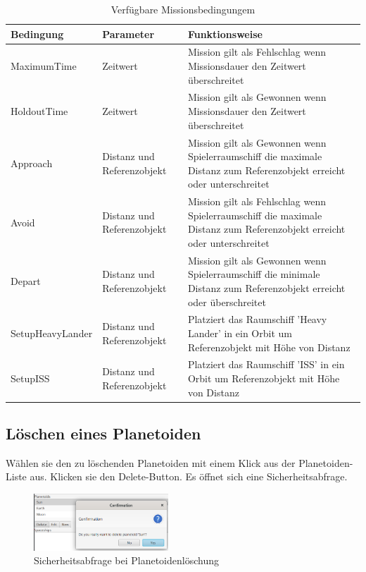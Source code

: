 \begin{table}[H]
	\centering
	\begin{tabular}{ || m{3cm} | m{5cm} | m{8cm} || }
		\hline
		\textbf{Bedingung} & \textbf{Parameter} & \textbf{Funktionsweise} \\
		\hline
		\hline
		MaximumTime & Zeitwert & Mission gilt als Fehlschlag wenn Missionsdauer den Zeitwert überschreitet \\
		\hline
		HoldoutTime & Zeitwert & Mission gilt als Gewonnen wenn Missionsdauer den Zeitwert überschreitet \\
		\hline
		Approach & Distanz und Referenzobjekt & Mission gilt als Gewonnen wenn Spielerraumschiff die maximale Distanz zum Referenzobjekt erreicht oder unterschreitet \\
		\hline
		Avoid & Distanz und Referenzobjekt & Mission gilt als Fehlschlag wenn Spielerraumschiff die maximale Distanz zum Referenzobjekt erreicht oder unterschreitet \\
		\hline
		Depart & Distanz und Referenzobjekt & Mission gilt als Gewonnen wenn Spielerraumschiff die minimale Distanz zum Referenzobjekt erreicht oder überschreitet \\
		\hline
		SetupHeavyLander & Distanz und Referenzobjekt & Platziert das Raumschiff 'Heavy Lander' in ein Orbit um Referenzobjekt mit Höhe von Distanz\\
		\hline
		SetupISS & Distanz und Referenzobjekt & Platziert das Raumschiff 'ISS' in ein Orbit um Referenzobjekt mit Höhe von Distanz\\
		\hline
	\end{tabular}
	\caption{Verfügbare Missionsbedingungem}
\end{table}

\subsection{Löschen eines Planetoiden}
Wählen sie den zu löschenden Planetoiden mit einem Klick aus der Planetoiden-Liste aus.
Klicken sie den Delete-Button.
Es öffnet sich eine Sicherheitsabfrage.

\begin{figure}[H]
	\centering
	\includegraphics[width=0.45\textwidth]{res/loeschenplanetoid.png}
	\caption{Sicherheitsabfrage bei Planetoidenlöschung}
\end{figure}

